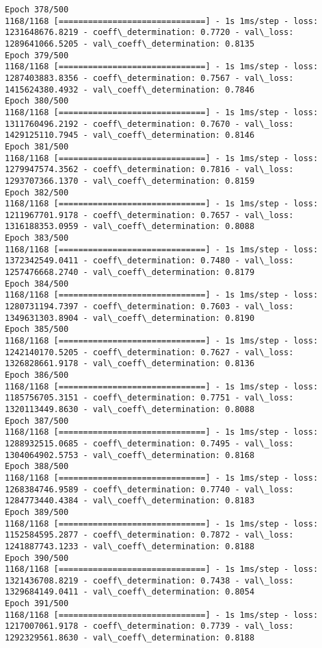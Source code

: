 \documentclass[11pt]{article}
\begin{document}
\begin{Verbatim}[commandchars=\\\{\}]
Epoch 378/500
1168/1168 [==============================] - 1s 1ms/step - loss: 1231648676.8219 - coeff\_determination: 0.7720 - val\_loss: 1289641066.5205 - val\_coeff\_determination: 0.8135
Epoch 379/500
1168/1168 [==============================] - 1s 1ms/step - loss: 1287403883.8356 - coeff\_determination: 0.7567 - val\_loss: 1415624380.4932 - val\_coeff\_determination: 0.7846
Epoch 380/500
1168/1168 [==============================] - 1s 1ms/step - loss: 1311760496.2192 - coeff\_determination: 0.7670 - val\_loss: 1429125110.7945 - val\_coeff\_determination: 0.8146
Epoch 381/500
1168/1168 [==============================] - 1s 1ms/step - loss: 1279947574.3562 - coeff\_determination: 0.7816 - val\_loss: 1293707366.1370 - val\_coeff\_determination: 0.8159
Epoch 382/500
1168/1168 [==============================] - 1s 1ms/step - loss: 1211967701.9178 - coeff\_determination: 0.7657 - val\_loss: 1316188353.0959 - val\_coeff\_determination: 0.8088
Epoch 383/500
1168/1168 [==============================] - 1s 1ms/step - loss: 1372342549.0411 - coeff\_determination: 0.7480 - val\_loss: 1257476668.2740 - val\_coeff\_determination: 0.8179
Epoch 384/500
1168/1168 [==============================] - 1s 1ms/step - loss: 1280731194.7397 - coeff\_determination: 0.7603 - val\_loss: 1349631303.8904 - val\_coeff\_determination: 0.8190
Epoch 385/500
1168/1168 [==============================] - 1s 1ms/step - loss: 1242140170.5205 - coeff\_determination: 0.7627 - val\_loss: 1326828661.9178 - val\_coeff\_determination: 0.8136
Epoch 386/500
1168/1168 [==============================] - 1s 1ms/step - loss: 1185756705.3151 - coeff\_determination: 0.7751 - val\_loss: 1320113449.8630 - val\_coeff\_determination: 0.8088
Epoch 387/500
1168/1168 [==============================] - 1s 1ms/step - loss: 1288932515.0685 - coeff\_determination: 0.7495 - val\_loss: 1304064902.5753 - val\_coeff\_determination: 0.8168
Epoch 388/500
1168/1168 [==============================] - 1s 1ms/step - loss: 1268384746.9589 - coeff\_determination: 0.7740 - val\_loss: 1284773440.4384 - val\_coeff\_determination: 0.8183
Epoch 389/500
1168/1168 [==============================] - 1s 1ms/step - loss: 1152584595.2877 - coeff\_determination: 0.7872 - val\_loss: 1241887743.1233 - val\_coeff\_determination: 0.8188
Epoch 390/500
1168/1168 [==============================] - 1s 1ms/step - loss: 1321436708.8219 - coeff\_determination: 0.7438 - val\_loss: 1329684149.0411 - val\_coeff\_determination: 0.8054
Epoch 391/500
1168/1168 [==============================] - 1s 1ms/step - loss: 1217007061.9178 - coeff\_determination: 0.7739 - val\_loss: 1292329561.8630 - val\_coeff\_determination: 0.8188

\end{Verbatim}
\end{document}
